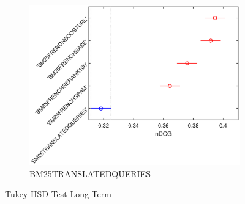 \begin{figure}[p]
     \begin{subfigure}[b]{0.49\textwidth}
         \centering
         \includegraphics[width=\textwidth]{figure/longterm/tukeyhsd-5.eps}
         \caption{BM25TRANSLATEDQUERIES}
         \label{fig:lthsd5}
     \end{subfigure}
        \caption{Tukey HSD Test Long Term}
        \label{fig:lthsd}
\end{figure}